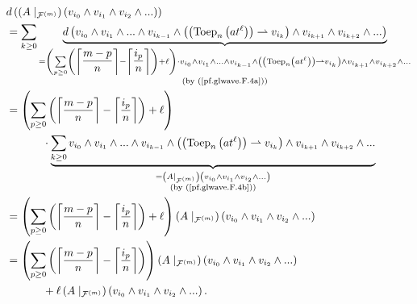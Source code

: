 \documentclass[etingof-lie.tex]{subfiles}
\begin{document}
\begin{align}
&  d\left(  \left(  A\mid_{\mathcal{F}^{\left(  m\right)  }}\right)  \left(
v_{i_{0}}\wedge v_{i_{1}}\wedge v_{i_{2}}\wedge...\right)  \right) \nonumber\\
&  =\sum\limits_{k\geq0}\underbrace{d\left(  v_{i_{0}}\wedge v_{i_{1}}%
\wedge...\wedge v_{i_{k-1}}\wedge\left(  \left(  \operatorname*{Toep}%
\nolimits_{n}\left(  at^{\ell}\right)  \right)  \rightharpoonup v_{i_{k}%
}\right)  \wedge v_{i_{k+1}}\wedge v_{i_{k+2}}\wedge...\right)  }%
_{\substack{=\left(  \sum\limits_{p\geq0}\left(  \left\lceil \dfrac{m-p}%
{n}\right\rceil -\left\lceil \dfrac{i_{p}}{n}\right\rceil \right)
+\ell\right)  \cdot v_{i_{0}}\wedge v_{i_{1}}\wedge...\wedge v_{i_{k-1}}%
\wedge\left(  \left(  \operatorname*{Toep}\nolimits_{n}\left(  at^{\ell
}\right)  \right)  \rightharpoonup v_{i_{k}}\right)  \wedge v_{i_{k+1}}\wedge
v_{i_{k+2}}\wedge...\\\text{(by (\ref{pf.glwave.F.4a}))}}}\nonumber\\
&  =\left(  \sum\limits_{p\geq0}\left(  \left\lceil \dfrac{m-p}{n}\right\rceil
-\left\lceil \dfrac{i_{p}}{n}\right\rceil \right)  +\ell\right) \nonumber\\
&  \ \ \ \ \ \ \ \ \ \ \cdot\underbrace{\sum\limits_{k\geq0}v_{i_{0}}\wedge
v_{i_{1}}\wedge...\wedge v_{i_{k-1}}\wedge\left(  \left(  \operatorname*{Toep}%
\nolimits_{n}\left(  at^{\ell}\right)  \right)  \rightharpoonup v_{i_{k}%
}\right)  \wedge v_{i_{k+1}}\wedge v_{i_{k+2}}\wedge...}_{\substack{=\left(
A\mid_{\mathcal{F}^{\left(  m\right)  }}\right)  \left(  v_{i_{0}}\wedge
v_{i_{1}}\wedge v_{i_{2}}\wedge...\right)  \\\text{(by (\ref{pf.glwave.F.4b}%
))}}}\nonumber\\
&  =\left(  \sum\limits_{p\geq0}\left(  \left\lceil \dfrac{m-p}{n}\right\rceil
-\left\lceil \dfrac{i_{p}}{n}\right\rceil \right)  +\ell\right)  \left(
A\mid_{\mathcal{F}^{\left(  m\right)  }}\right)  \left(  v_{i_{0}}\wedge
v_{i_{1}}\wedge v_{i_{2}}\wedge...\right) \nonumber\\
&  =\left(  \sum\limits_{p\geq0}\left(  \left\lceil \dfrac{m-p}{n}\right\rceil
-\left\lceil \dfrac{i_{p}}{n}\right\rceil \right)  \right)  \left(
A\mid_{\mathcal{F}^{\left(  m\right)  }}\right)  \left(  v_{i_{0}}\wedge
v_{i_{1}}\wedge v_{i_{2}}\wedge...\right) \nonumber\\
&  \ \ \ \ \ \ \ \ \ \ +\ell\left(  A\mid_{\mathcal{F}^{\left(  m\right)  }%
}\right)  \left(  v_{i_{0}}\wedge v_{i_{1}}\wedge v_{i_{2}}\wedge...\right)  .
\label{pf.glwave.F.10}%
\end{align}
\end{document}
